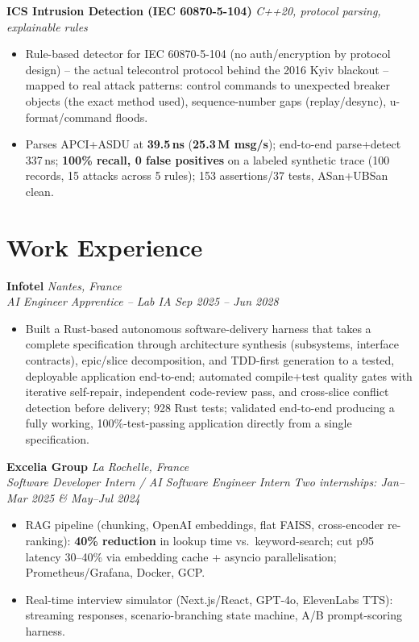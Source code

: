 \documentclass[10pt]{article}
\newcommand{\entry}[4]{%
  \noindent\textbf{#1} \hfill \textit{#2} \\
  \textit{#3} \hfill \textit{#4}\\[-0.3em]
}
\newcommand{\projectentry}[2]{%
  \noindent\textbf{#1} \hfill \textit{#2}\\[-0.3em]
}
\begin{document}
\projectentry{ICS Intrusion Detection (IEC 60870-5-104)}{C++20, protocol parsing, explainable rules}
\begin{itemize}
  \item Rule-based detector for IEC 60870-5-104 (no auth/encryption by protocol design) -- the actual telecontrol protocol behind the 2016 Kyiv blackout -- mapped to real attack patterns: control commands to unexpected breaker objects (the exact method used), sequence-number gaps (replay/desync), u-format/command floods.
  \item Parses APCI+ASDU at \textbf{39.5\,ns} (\textbf{25.3\,M msg/s}); end-to-end parse+detect 337\,ns; \textbf{100\% recall, 0 false positives} on a labeled synthetic trace (100 records, 15 attacks across 5 rules); 153 assertions/37 tests, ASan+UBSan clean.
\end{itemize}

\section*{Work Experience}
\entry{Infotel}{Nantes, France}{AI Engineer Apprentice -- Lab IA}{Sep 2025 -- Jun 2028}
\begin{itemize}
  \item Built a Rust-based autonomous software-delivery harness that takes a complete specification through architecture synthesis (subsystems, interface contracts), epic/slice decomposition, and TDD-first generation to a tested, deployable application end-to-end; automated compile+test quality gates with iterative self-repair, independent code-review pass, and cross-slice conflict detection before delivery; 928 Rust tests; validated end-to-end producing a fully working, 100\%-test-passing application directly from a single specification.
\end{itemize}
\entry{Excelia Group}{La Rochelle, France}{Software Developer Intern / AI Software Engineer Intern}{Two internships: Jan--Mar 2025 \& May--Jul 2024}
\begin{itemize}
  \item RAG pipeline (chunking, OpenAI embeddings, flat FAISS, cross-encoder re-ranking): \textbf{40\% reduction} in lookup time vs.\ keyword-search; cut p95 latency 30--40\% via embedding cache + asyncio parallelisation; Prometheus/Grafana, Docker, GCP.
  \item Real-time interview simulator (Next.js/React, GPT-4o, ElevenLabs TTS): streaming responses, scenario-branching state machine, A/B prompt-scoring harness.
\end{itemize}
\end{document}
